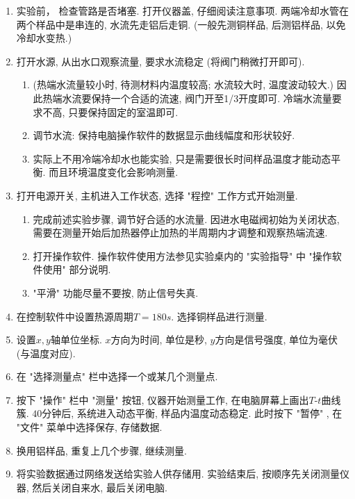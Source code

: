 \documentclass[11pt]{article}
\begin{document}
\begin{enumerate}
	
	\item 实验前， 检查管路是否堵塞. 打开仪器盖, 仔细阅读注意事项. 两端冷却水管在两个样品中是串连的, 水流先走铝后走铜. (一般先测铜样品, 后测铝样品, 以免冷却水变热.)
	
	\item 打开水源, 从出水口观察流量, 要求水流稳定 (将阀门稍微打开即可).
	
	\begin{enumerate}
		
		\item (热端水流量较小时, 待测材料内温度较高; 水流较大时, 温度波动较大.) 因此热端水流要保持一个合适的流速, 阀门开至1/3开度即可. 冷端水流量要求不高, 只要保持固定的室温即可. 
		
		\item 调节水流: 保持电脑操作软件的数据显示曲线幅度和形状较好.
		
		\item 实际上不用冷端冷却水也能实验, 只是需要很长时间样品温度才能动态平衡. 而且环境温度变化会影响测量. 
		
	\end{enumerate}
	
	\item 打开电源开关, 主机进入工作状态, 选择 "程控" 工作方式开始测量.
	
	\begin{enumerate}
		
		\item 完成前述实验步骤, 调节好合适的水流量. 因进水电磁阀初始为关闭状态, 需要在测量开始后加热器停止加热的半周期内才调整和观察热端流速. 
		
		\item 打开操作软件. 操作软件使用方法参见实验桌内的 "实验指导" 中 "操作软件使用" 部分说明.
		
		\item "平滑" 功能尽量不要按, 防止信号失真. 
	\end{enumerate}
	
	\item 在控制软件中设置热源周期$T = 180\unit{s}$. 选择铜样品进行测量. 
	
	\item 设置$x,y$轴单位坐标. $x$方向为时间, 单位是秒, $y$方向是信号强度, 单位为毫伏 (与温度对应). 
	
	\item 在 "选择测量点" 栏中选择一个或某几个测量点. 
	
	\item 按下 "操作" 栏中 "测量" 按钮, 仪器开始测量工作, 在电脑屏幕上画出$T$-$t$曲线簇. $40$分钟后, 系统进入动态平衡, 样品内温度动态稳定. 此时按下 "暂停" , 在 "文件" 菜单中选择保存, 存储数据.
	
	\item 换用铝样品, 重复上几个步骤, 继续测量.
	
	\item 将实验数据通过网络发送给实验人供存储用. 实验结束后, 按顺序先关闭测量仪器, 然后关闭自来水, 最后关闭电脑. 
	
\end{enumerate}
\end{document}
